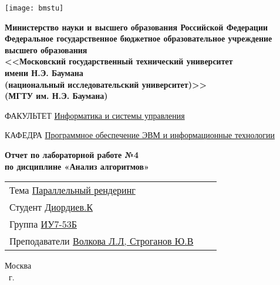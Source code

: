     \thispagestyle{empty}

    \noindent\begin{minipage}{0.05\textwidth}
        \texttt{[image: bmstu]}
    \end{minipage}
    \hfill
    \begin{minipage}{0.85\textwidth}\raggedleft
        \begin{center}
            \fontsize{10pt}{0.3\baselineskip}\selectfont \textbf{Министерство науки и высшего образования Российской Федерации \\ Федеральное государственное бюджетное образовательное учреждение \\ высшего образования \\ <<Московский государственный технический университет \\ имени Н.Э. Баумана \\ (национальный исследовательский университет)>> \\ (МГТУ им. Н.Э. Баумана)}
        \end{center}
    \end{minipage}

    \begin{center}
        \fontsize{12pt}{0.1\baselineskip}\selectfont
        \noindent\makebox[\linewidth]{\rule{\textwidth}{4pt}} \makebox[\linewidth]{\rule{\textwidth}{1pt}}
    \end{center}

    \begin{flushleft}
        \fontsize{12pt}{0.8\baselineskip}\selectfont

        ФАКУЛЬТЕТ \uline{
            \hfill
            Информатика и системы управления
            \hfill}

        КАФЕДРА \uline{\mbox{\hspace{4mm}}
            \hfill
            Программное обеспечение ЭВМ и информационные технологии
            \hfill}
    \end{flushleft}

    \vfill
    
    \begin{center}
        \fontsize{19pt}{\baselineskip}\selectfont

        \textbf{Отчет по лабораторной работе №4} \\
        \textbf{по дисциплине «Анализ алгоритмов»}
    \end{center}

    \vfill
    
    \begin{tabularx}{\textwidth}{Xcc}
        Тема \uline{Параллельный рендеринг} \\
        Студент \uline{Диордиев.К} \\
        Группа \uline{ИУ7-53Б} \\
        Преподаватели \uline{Волкова Л.Л, Строганов Ю.В} \\
    \end{tabularx}
    
    \vfill
    
    \begin{center}
        \normalsize Москва \\
        \the\year ~г.
    \end{center}
